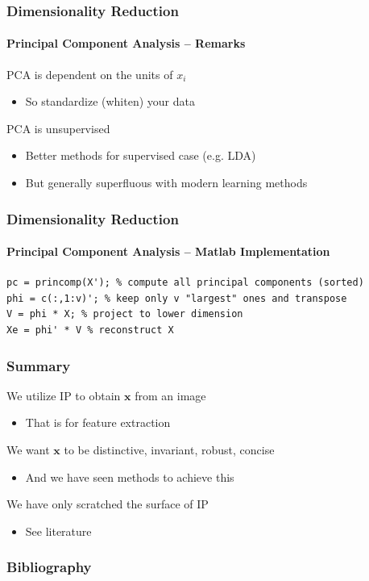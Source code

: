 \documentclass[xetex,professionalfont]{beamer}
\newcommand{\eg}{\mbox{e.g.}\xspace} %
\renewcommand{\vec}[1]{\ensuremath{\mathbf{#1}}}
\newcommand{\vx}{\vec{x}}
\begin{document}

\begin{frame}
\frametitle{Dimensionality Reduction}
\framesubtitle{Principal Component Analysis -- Remarks}

PCA is dependent on the units of $x_i$
\begin{itemize}
	\item So standardize (whiten) your data %
\end{itemize}

\bigskip
PCA is unsupervised
\begin{itemize}
	\item Better methods for supervised case (\eg LDA) %
	\item But generally superfluous with modern learning methods %
\end{itemize}

\end{frame}


\begin{frame}[fragile]
\frametitle{Dimensionality Reduction}
\framesubtitle{Principal Component Analysis -- Matlab Implementation}


\begin{verbatim}
pc = princomp(X'); % compute all principal components (sorted)
phi = c(:,1:v)'; % keep only v "largest" ones and transpose
V = phi * X; % project to lower dimension
Xe = phi' * V % reconstruct X
\end{verbatim}

\end{frame}


\begin{frame}
\frametitle{Summary}

We utilize IP to obtain $\vx$ from an image
\begin{itemize}
	\item That is for feature extraction
\end{itemize}

\bigskip
We want $\vx$ to be distinctive, invariant, robust, concise
\begin{itemize}
	\item And we have seen methods to achieve this
\end{itemize}

\bigskip
We have only scratched the surface of IP
\begin{itemize}
	\item See literature
\end{itemize}

\end{frame}


\begin{frame}
\frametitle{Bibliography}

\printbibliography

\end{frame}
\end{document}
